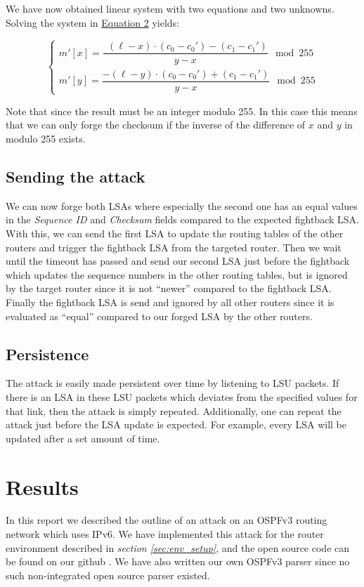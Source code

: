 \documentclass[11pt,a4paper,oneside]{article}
\newcommand{\lsection}[2]{\section{#1}\label{sec:#2}}
\newcommand{\lsubsection}[2]{\subsection{#1}\label{sec:#2}}
\begin{document}
    	We have now obtained linear system with two equations and two unknowns. Solving the system in \hyperref[eq:2]{Equation 2} yields:
    
\begin{equation}\label{eq:3}
\begin{cases}
    m'[x] = \dfrac{\ \ (\ell - x) \cdot (c_0 - c_0') - (c_1 - c_1')}{y - x} \mod{255}\\
    m'[y] = \dfrac{-(\ell - y) \cdot (c_0 - c_0') + (c_1 - c_1')}{y - x} \mod{255}
\end{cases}
\end{equation}
		
    		Note that since the result must be an integer modulo 255. In this case this means that we can only forge the checksum if the inverse of the difference of $x$ and $y$ in modulo 255 exists.
    
    \lsubsection{Sending the attack}{send_attack}
    		We can now forge both LSAs where especially the second one has an equal values in the \textit{Sequence ID} and \textit{Checksum} fields compared to the expected fightback LSA.
	    With this, we can send the first LSA to update the routing tables of the other routers and trigger the fightback LSA from the targeted router. Then we wait until the timeout has passed and send our second LSA just before the fightback which updates the sequence numbers in the other routing tables, but is ignored by the target router since it is not ``newer'' compared to the fightback LSA. Finally the fightback LSA is send and ignored by all other routers since it is evaluated as ``equal'' compared to our forged LSA by the other routers.
	    
	\lsubsection{Persistence}{persistence}
		The attack is easily made persistent over time by listening to LSU packets. If there is an LSA in these LSU packets which deviates from the specified values for that link, then the attack is simply repeated.
		Additionally, one can repeat the attack just before the LSA update is expected. For example, every LSA will be updated after a set amount of time.
		
		
    \lsection{Results}{results}
		In this report we described the outline of an attack on an OSPFv3 routing network which uses IPv6. We have implemented this attack for the router environment described in \textit{section \ref{sec:env_setup}}, and the open source code can be found on our github \cite{wiki}. We have also written our own OSPFv3 parser since no such non-integrated open source parser existed.
		
\end{document}
